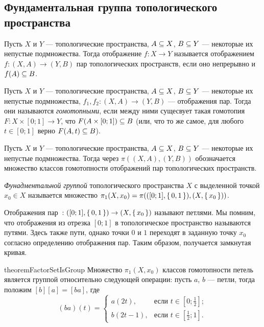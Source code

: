 \documentclass[main]{subfiles}
\begin{document}
\subsection{Фундаментальная группа топологического пространства}

\begin{definition}
	Пусть $X$ и $ Y $ --- топологические пространства, $ A \subseteq X $, $ B \subseteq Y $ --- некоторые их непустые
	подмножества. Тогда отображение $ f \colon X \to Y $ называется отображением $ f \colon (X, A) \to (Y, B) $
	пар топологических пространств, если оно непрерывно и $ f(A) \subseteq B $.
\end{definition}

\begin{definition}
	Пусть $X$ и $ Y $ --- топологические пространства, $ A \subseteq X $, $ B \subseteq Y $ --- некоторые их непустые
	подмножества, $ f_1, f_2 \colon (X, A) \to (Y, B) $ --- отображения пар. Тогда они называются \emph{гомотопными},
	если между ними сущесвует такая гомотопия $ F \colon X \times [0; 1] \to Y $, что $ F(A \times [0; 1]) \subseteq B $
	(или, что то же самое, для любого $ t \in [0; 1] $ верно $ F(A, t) \subseteq B $).
\end{definition}

\begin{definition}
	Пусть $X$ и $ Y $ --- топологические пространства, $ A \subseteq X $, $ B \subseteq Y $ --- некоторые их непустые
	подмножества. Тогда через $ \pi((X, A), (Y, B))$ обозначается множество классов гомотопности отображений пар
	топологических пространств.
\end{definition}

\begin{definition}
	\emph{Фунадментальной группой} топологического пространства $ X $ с выделенной точкой $ x_0 \in X $ называется множество
	$ \pi_1(X, x_0) = \pi(([0; 1], \left\{\,0, 1\,\right\}), (X, \left\{\,x_0\,\right\})) $.
\end{definition}

\begin{remark}
	Отображения пар $ \colon ([0; 1], \left\{\,0, 1\,\right\}) \to (X, \left\{\,x_0\,\right\}) $ называют петлями. Мы помним, что отображения из
	отрезка $ [0; 1] $ в топологическое пространство называются путями. Здесь также пути, однако точки $ 0 $ и $ 1 $
	переходят в заданную точку $ x_0 $ согласно определению отображения пар. Таким образом, получается замкнутая
	кривая.
\end{remark}

\begin{restatable}{theorem}{FactorSetIsGroup}
	Множество $ \pi_1(X, x_0) $ классов гомотопности петель является группой относительно следующей операции:
	пусть $ a $, $ b $ --- петли, тогда положим $ [b][a] = [ba] $, где
		\[ (ba)(t) = \begin{cases}
				a(2 t), & \text{если } t \in \left[ 0; \frac{1}{2} \right]; \\
				b(2 t - 1), & \text{если } t \in \left[ \frac{1}{2}; 1 \right].
			\end{cases}
		\]
\end{restatable}
\end{document}
